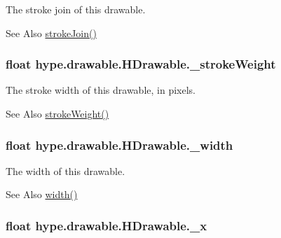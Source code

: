 The stroke join of this drawable. 

\begin{DoxySeeAlso}{See Also}
\hyperlink{classhype_1_1drawable_1_1_h_drawable_aa0f8402fa01dd4a77cb2f46fd869e290}{stroke\-Join()} 
\end{DoxySeeAlso}
\hypertarget{classhype_1_1drawable_1_1_h_drawable_a2acc834533b5ca66f767d766fb6fed58}{
\subsubsection[{\-\_\-stroke\-Weight}]{\setlength{\rightskip}{0pt plus 5cm}float hype.\-drawable.\-H\-Drawable.\-\_\-stroke\-Weight\hspace{0.3cm}{\ttfamily [protected]}}}\label{classhype_1_1drawable_1_1_h_drawable_a2acc834533b5ca66f767d766fb6fed58}


The stroke width of this drawable, in pixels. 

\begin{DoxySeeAlso}{See Also}
\hyperlink{classhype_1_1drawable_1_1_h_drawable_addcad70b22c1df45f52562394e4db624}{stroke\-Weight()} 
\end{DoxySeeAlso}
\hypertarget{classhype_1_1drawable_1_1_h_drawable_a3db419b74918a85aee0744fd18aad058}{
\subsubsection[{\-\_\-width}]{\setlength{\rightskip}{0pt plus 5cm}float hype.\-drawable.\-H\-Drawable.\-\_\-width\hspace{0.3cm}{\ttfamily [protected]}}}\label{classhype_1_1drawable_1_1_h_drawable_a3db419b74918a85aee0744fd18aad058}


The width of this drawable. 

\begin{DoxySeeAlso}{See Also}
\hyperlink{classhype_1_1drawable_1_1_h_drawable_a5ea542d92e402b30ed584e03f417f61f}{width()} 
\end{DoxySeeAlso}
\hypertarget{classhype_1_1drawable_1_1_h_drawable_a20c0ae16de46b74c903667ac2db1640a}{
\subsubsection[{\-\_\-x}]{\setlength{\rightskip}{0pt plus 5cm}float hype.\-drawable.\-H\-Drawable.\-\_\-x\hspace{0.3cm}{\ttfamily [protected]}}}\label{classhype_1_1drawable_1_1_h_drawable_a20c0ae16de46b74c903667ac2db1640a}



